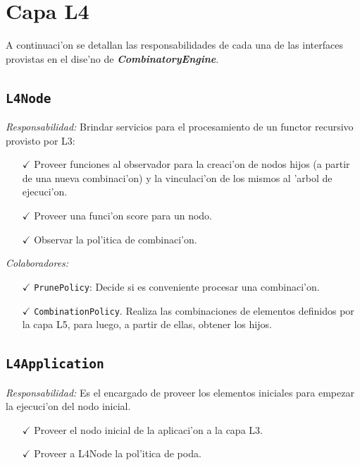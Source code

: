 \documentclass[a4paper,10pt,twoside]{article}
\def\ra {\textbf{\textit{CombinatoryEngine}}}
\begin{document}
        
    \section{Capa L4}
    A continuaci'on se detallan las responsabilidades de cada una de las interfaces provistas en el dise'no de \ra.
    
        \subsection{\texttt{L4Node}}
        \textit{Responsabilidad:} Brindar servicios para el procesamiento de un functor recursivo provisto por L3:
		\begin{itemize}
		     \item [$\checkmark$] Proveer funciones al observador para la creaci'on de nodos hijos (a partir de una nueva combinaci'on) y la vinculaci'on de los mismos al 'arbol de ejecuci'on.
		     \item [$\checkmark$] Proveer una funci'on score para un nodo.
		     \item [$\checkmark$] Observar la pol'itica de combinaci'on.

		\end{itemize}
	
	\textit{Colaboradores:} 
		\begin{itemize}
			\item [$\checkmark$] \texttt{PrunePolicy}: Decide si es conveniente procesar una combinaci'on.
			\item [$\checkmark$] \texttt{CombinationPolicy}. Realiza las combinaciones de elementos definidos por la capa L5, para luego, a partir de ellas, obtener los hijos.\\ 
		\end{itemize}		
        
        

	\subsection{\texttt{L4Application}}
        \textit{Responsabilidad:} Es el encargado de proveer los elementos iniciales para empezar la ejecuci'on del nodo inicial.
		\begin{itemize}
			\item [$\checkmark$] Proveer el nodo inicial de la aplicaci'on a la capa L3.
			\item [$\checkmark$] Proveer a L4Node la pol'itica de poda.
		\end{itemize}
\end{document}
